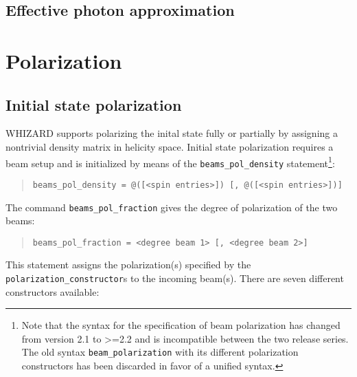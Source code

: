 \documentclass[12pt]{book}
\newcommand{\ttt}[1]{\texttt{#1}}
\begin{document}
\subsection{Effective photon approximation}

\section{Polarization}
\label{sec:polarization}

\subsection{Initial state polarization}

WHIZARD supports polarizing the inital state fully or partially by
assigning a nontrivial density matrix in helicity space. 
Initial state polarization requires a beam setup and is initialized by
means of the \ttt{beams\_pol\_density} statement\footnote{Note that
  the syntax for the specification of beam polarization has changed
  from version 2.1 to >=2.2 and is incompatible between the two release
  series. The old syntax \ttt{beam\_polarization} with its different
  polarization constructors has been discarded in favor of a unified
  syntax.}:
\begin{quote}
\begin{footnotesize}
\begin{verbatim}
beams_pol_density = @([<spin entries>]) [, @([<spin entries>])]
\end{verbatim}
\end{footnotesize}
\end{quote}
The command \ttt{beams\_pol\_fraction} gives the degree of
polarization of the two beams:
\begin{quote}
\begin{footnotesize}
\begin{verbatim}
beams_pol_fraction = <degree beam 1> [, <degree beam 2>]
\end{verbatim}
\end{footnotesize}
\end{quote}
This statement assigns the polarization(s) specified by the
\ttt{polarization\_constructor}s to the incoming beam(s). There are seven
different constructors available:
%
\end{document}
